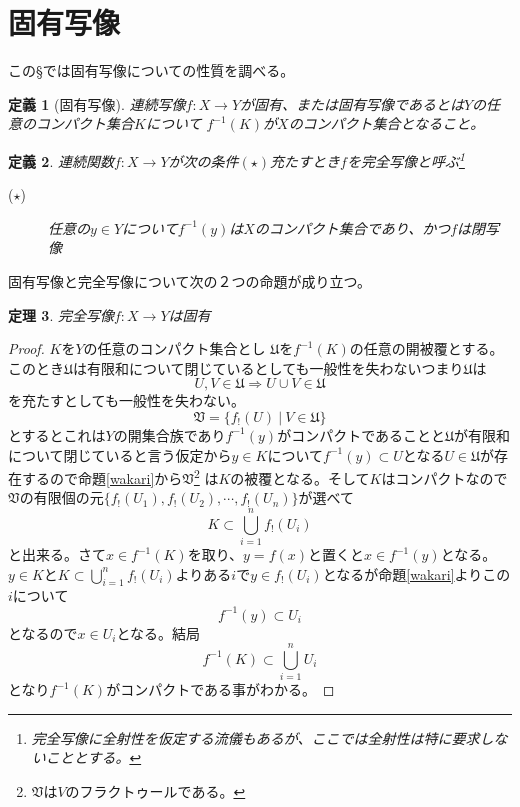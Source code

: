 \documentclass[leqno]{jsarticle}
\newtheorem{thm}{定理}
\newtheorem{df}[thm]{定義}
\newcommand{\To}{\Longrightarrow}
\begin{document}
\section{固有写像}
この\S では固有写像についての性質を調べる。
\begin{df}[固有写像]
連続写像$f:X\to Y$が固有、または固有写像であるとは$Y$の任意のコンパクト集合$K$について
$f^{-1}(K)$が$X$のコンパクト集合となること。
\end{df}

\begin{df}連続関数$f:X\to Y$が次の条件$(\star)$充たすとき$f$を完全写像と呼ぶ\footnote{完全写像に全射性を仮定する流儀もあるが、ここでは全射性は特に要求しないこととする。}
\begin{description}
\item[($\star$)]任意の$y\in Y$について$f^{-1}(y)$は$X$のコンパクト集合であり、かつ$f$は閉写像
\end{description}
\end{df}

固有写像と完全写像について次の２つの命題が成り立つ。

\begin{thm}
完全写像$f:X\to Y$は固有
\end{thm}
\begin{proof}$K$を$Y$の任意のコンパクト集合とし
$\mathfrak{U}$を$f^{-1}(K)$の任意の開被覆とする。このとき$\mathfrak{U}$は有限和について閉じているとしても一般性を失わないつまり$\mathfrak{U}$は
\[
U,V\in \mathfrak{U}\To U\cup V\in\mathfrak{U}
\]
を充たすとしても一般性を失わない。
\[
\mathfrak{V}=\{f_!(U)\ |\ V\in \mathfrak{U}\}
\]
とするとこれは$Y$の開集合族であり$f^{-1}(y)$がコンパクトであることと$\mathfrak{U}$が有限和について閉じていると言う仮定から$y\in K$について$f^{-1}(y)\subset U$となる$U\in \mathfrak{U}$が存在するので命題\ref{wakari}から$\mathfrak{V}$\footnote{$\mathfrak{V}$は$V$のフラクトゥールである。}
は$K$の被覆となる。そして$K$はコンパクトなので$\mathfrak{V}$の有限個の元$\{f_!(U_1),f_!(U_2),\cdots ,f_!(U_n)\}$が選べて
\[
K\subset \bigcup_{i=1}^nf_!(U_i)
\]
と出来る。さて$x\in f^{-1}(K)$を取り、$y=f(x)$と置くと$x\in f^{-1}(y)$となる。$y\in K$と$K\subset \bigcup_{i=1}^nf_!(U_i)$よりある$i$で$y\in f_!(U_i)$となるが命題\ref{wakari}よりこの$i$について
\[
f^{-1}(y)\subset U_i
\]
となるので$x\in U_i$となる。結局
\[
f^{-1}(K)\subset \bigcup_{i=1}^nU_i
\]
となり$f^{-1}(K)$がコンパクトである事がわかる。
\end{proof}
\end{document}
